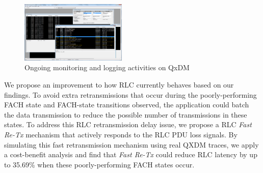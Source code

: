 \begin{figure}[h!]
\centering
\includegraphics[width=0.45\textwidth]{figs/QxDM.png}
\caption{Ongoing monitoring and logging activities on QxDM}
\label{fig:qxdm}
\end{figure}

\label{sec:intro}

We propose an improvement to how RLC currently behaves based on our findings. To avoid extra retransmissions that occur during the poorly-performing FACH state and FACH-state transitions observed, the application could batch the data transmission to reduce the possible number of transmissions in these states.  To address this RLC retransmission delay issue, we propose a RLC \emph{Fast Re-Tx} mechanism that actively responds to the RLC PDU loss signals. By simulating this fast retransmission mechanism using real QXDM traces, we apply a cost-benefit analysis and find that \emph{Fast Re-Tx} could reduce RLC latency by up to 35.69\% when these poorly-performing FACH states occur. 
